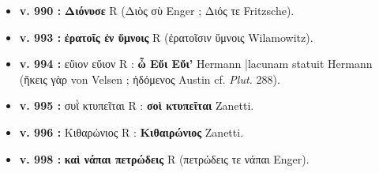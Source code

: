 \documentclass[10pt, a4paper, twoside]{book}
\renewcommand{\_}{\origunderscore\penalty0\relax}
\providecommand{\italique}[1]{\emph{#1}}
\providecommand{\lecon}[1]{\textbf{#1}}
\providecommand{\espApp}{\hspace{0.5em}|\hspace{0.5em}}
\begin{document}
\begin{itemize}
\begin{itemize}
    \item \textbf{v. 990 :} \lecon{Διόνυσε} R (Διὸς σὺ Enger ; Διός τε Fritzsche).
    \item \textbf{v. 993 :} \lecon{ἐρατοῖς ἐν ὕμνοις} R (ἐρατοῖσιν ὕμνοις Wilamowitz).
    \item \textbf{v. 994 :} εὔιον εὔιον R : \lecon{ὦ Εὔι Εὔι'} Hermann \espApp lacunam statuit Hermann (ἥκεις γὰρ von Velsen ; ἡδόμενος Austin cf. \italique{Plut.} 288).
    \item \textbf{v. 995 :} συῒ κτυπεῖται R : \lecon{σοὶ κτυπεῖται} Zanetti.
    \item \textbf{v. 996 :} Κιθαρώνιος R : \lecon{Κιθαιρώνιος} Zanetti.
    \item \textbf{v. 998 :} \lecon{καὶ νάπαι πετρώδεις} R (πετρώδεις τε νάπαι Enger).
  \end{itemize}
\end{itemize}
\end{document}
